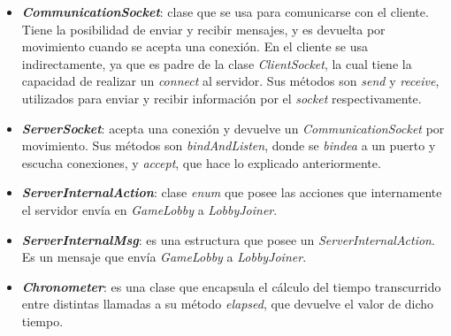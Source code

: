 \begin{itemize}
	\item \textbf{\textit{CommunicationSocket}}: clase que se usa para comunicarse con el cliente. Tiene la posibilidad de enviar y recibir mensajes, y es devuelta por movimiento cuando se acepta una conexión. En el cliente se usa indirectamente, ya que es padre de la clase \textit{ClientSocket}, la cual tiene la capacidad de realizar un \textit{connect} al servidor. Sus métodos son \textit{send} y \textit{receive}, utilizados para enviar y recibir información por el \textit{socket} respectivamente.
	
	\item \textbf{\textit{ServerSocket}}: acepta una conexión y devuelve un \textit{CommunicationSocket} por movimiento. Sus métodos son \textit{bindAndListen}, donde se \textit{bindea} a un puerto y escucha conexiones, y \textit{accept}, que hace lo explicado anteriormente.
	
	\item \textbf{\textit{ServerInternalAction}}: clase \textit{enum} que posee las acciones que internamente el servidor envía en \textit{GameLobby} a \textit{LobbyJoiner}.
	
	\item \textbf{\textit{ServerInternalMsg}}: es una estructura que posee un \textit{ServerInternalAction}. Es un mensaje que envía \textit{GameLobby} a \textit{LobbyJoiner}.
	
	\item \textbf{\textit{Chronometer}}: es una clase que encapsula el cálculo del tiempo transcurrido entre distintas llamadas a su método \textit{elapsed}, que devuelve el valor de dicho tiempo.
	

\end{itemize}
